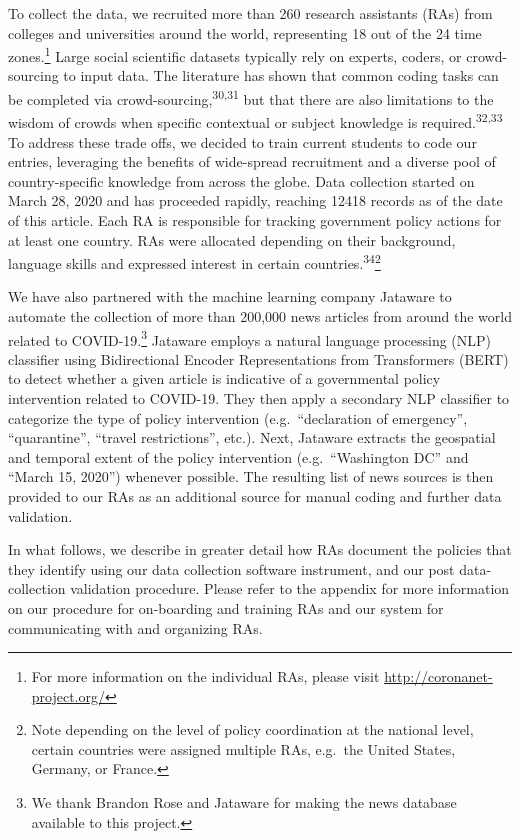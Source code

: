 \documentclass[
]{article}
\begin{document}
To collect the data, we recruited more than 260 research assistants (RAs) from colleges and universities around the world, representing 18 out of the 24 time zones.\footnote{For more information on the individual RAs, please visit \url{http://coronanet-project.org/}} Large social scientific datasets typically rely on experts, coders, or crowd-sourcing to input data. The literature has shown that common coding tasks can be completed via crowd-sourcing,\textsuperscript{30,31} but that there are also limitations to the wisdom of crowds when specific contextual or subject knowledge is required.\textsuperscript{32,33} To address these trade offs, we decided to train current students to code our entries, leveraging the benefits of wide-spread recruitment and a diverse pool of country-specific knowledge from across the globe. Data collection started on March 28, 2020 and has proceeded rapidly, reaching 12418 records as of the date of this article. Each RA is responsible for tracking government policy actions for at least one country. RAs were allocated depending on their background, language skills and expressed interest in certain countries.\textsuperscript{34}\footnote{Note depending on the level of policy coordination at the national level, certain countries were assigned multiple RAs, e.g.~the United States, Germany, or France.}

We have also partnered with the machine learning company Jataware to automate the collection of more than 200,000 news articles from around the world related to COVID-19.\footnote{We thank Brandon Rose and Jataware for making the news database available to this project.} Jataware employs a natural language processing (NLP) classifier using Bidirectional Encoder Representations from Transformers (BERT) to detect whether a given article is indicative of a governmental policy intervention related to COVID-19. They then apply a secondary NLP classifier to categorize the type of policy intervention (e.g.~``declaration of emergency'', ``quarantine'', ``travel restrictions'', etc.). Next, Jataware extracts the geospatial and temporal extent of the policy intervention (e.g.~``Washington DC'' and ``March 15, 2020'') whenever possible. The resulting list of news sources is then provided to our RAs as an additional source for manual coding and further data validation.

In what follows, we describe in greater detail how RAs document the policies that they identify using our data collection software instrument, and our post data-collection validation procedure. Please refer to the appendix for more information on our procedure for on-boarding and training RAs and our system for communicating with and organizing RAs.
\end{document}
